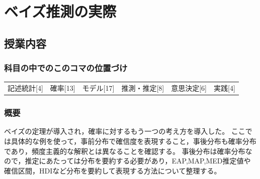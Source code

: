 \section{ベイズ推測の実際}
\label{D1_lesson26}

\subsection{授業内容}
\subsubsection{科目の中でのこのコマの位置づけ}
\begin{tabular}[t]{cccccc}
    記述統計[4] & 確率[13] & モデル[17] & 推測・推定[8] & 意思決定[6] & 実践[4]
\end{tabular}

\subsubsection{概要}
ベイズの定理が導入され，確率に対するもう一つの考え方を導入した。
ここでは具体的な例を使って，事前分布で確信度を表現すること，事後分布も確率分布であり，頻度主義的な解釈とは異なることを確認する。
事後分布は確率分布なので，推定にあたっては分布を要約する必要があり，EAP,MAP,MED推定値や確信区間，HDIなど分布を要約して表現する方法について整理する。
